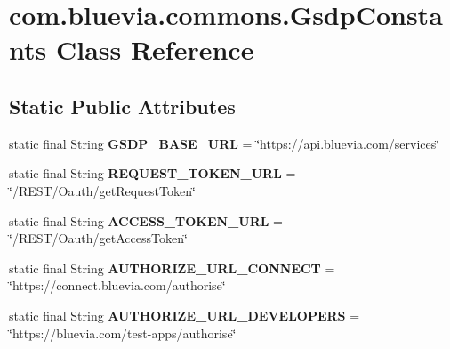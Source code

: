 \hypertarget{classcom_1_1bluevia_1_1commons_1_1GsdpConstants}{
\section{com.bluevia.commons.GsdpConstants Class Reference}
\label{classcom_1_1bluevia_1_1commons_1_1GsdpConstants}
}
\subsection*{Static Public Attributes}
\begin{DoxyCompactItemize}
\item 
\hypertarget{classcom_1_1bluevia_1_1commons_1_1GsdpConstants_a012ed15edf4c7cc7e1e0be7e5ce730ce}{
static final String {\bfseries GSDP\_\-BASE\_\-URL} = \char`\"{}https://api.bluevia.com/services\char`\"{}}
\label{classcom_1_1bluevia_1_1commons_1_1GsdpConstants_a012ed15edf4c7cc7e1e0be7e5ce730ce}

\item 
\hypertarget{classcom_1_1bluevia_1_1commons_1_1GsdpConstants_a67b46d9e110d41fdc31ab35d42fad680}{
static final String {\bfseries REQUEST\_\-TOKEN\_\-URL} = \char`\"{}/REST/Oauth/getRequestToken\char`\"{}}
\label{classcom_1_1bluevia_1_1commons_1_1GsdpConstants_a67b46d9e110d41fdc31ab35d42fad680}

\item 
\hypertarget{classcom_1_1bluevia_1_1commons_1_1GsdpConstants_af5020257ab1eb6c98f15115201ebe68c}{
static final String {\bfseries ACCESS\_\-TOKEN\_\-URL} = \char`\"{}/REST/Oauth/getAccessToken\char`\"{}}
\label{classcom_1_1bluevia_1_1commons_1_1GsdpConstants_af5020257ab1eb6c98f15115201ebe68c}

\item 
\hypertarget{classcom_1_1bluevia_1_1commons_1_1GsdpConstants_a24817ec1b250e67fbe90e485e9855d64}{
static final String {\bfseries AUTHORIZE\_\-URL\_\-CONNECT} = \char`\"{}https://connect.bluevia.com/authorise\char`\"{}}
\label{classcom_1_1bluevia_1_1commons_1_1GsdpConstants_a24817ec1b250e67fbe90e485e9855d64}

\item 
\hypertarget{classcom_1_1bluevia_1_1commons_1_1GsdpConstants_a5e618a818f306fed01771f381b6c31a7}{
static final String {\bfseries AUTHORIZE\_\-URL\_\-DEVELOPERS} = \char`\"{}https://bluevia.com/test-\/apps/authorise\char`\"{}}
\label{classcom_1_1bluevia_1_1commons_1_1GsdpConstants_a5e618a818f306fed01771f381b6c31a7}


\end{DoxyCompactItemize}
